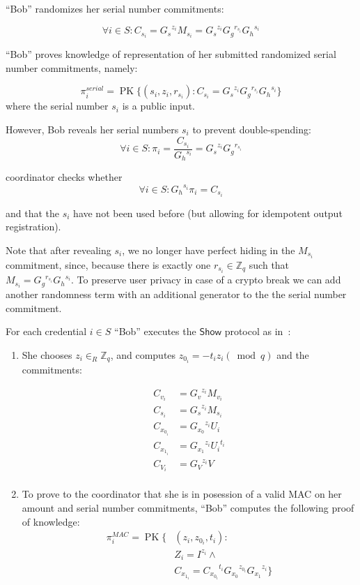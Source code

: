 \documentclass{article}
\begin{document}
``Bob'' randomizes her serial number commitments:

\[ \forall i \in S: C_{{s_i}}={G_s}^{z_i}M_{s_i}={G_s}^{z_i}{G_g}^{r_{s_i}}{G_h}^{s_i} \]

``Bob'' proves knowledge of representation of her submitted randomized serial number commitments, namely:

\[
\pi_{i}^{\mathit{serial}}=\operatorname{PK}\{ (s_i, z_i, r_{s_i}):C_{s_i} = {G_s}^{z_i}{G_g}^{r_{s_i}}{G_h}^{s_i}
\}
\]
where the serial number $s_i$ is a public input.

However, Bob reveals her serial numbers $s_i$ to prevent double-spending:
\[ \forall i \in S: \pi_i=\frac{C_{{s_i}}}{{G_h}^{s_i}} = {G_s}^{z_i} {G_g}^{r_{s_i}} \]

coordinator checks whether \[ \forall i \in S: {G_h}^{s_i} \pi_i = C_{s_i} \]

and that the $s_i$ have not been used before (but allowing for idempotent output registration).

Note that after revealing $s_i$, we no longer have perfect hiding in the $M_{s_i}$ commitment, since, because there is exactly one $r_{s_i} \in \mathbb{Z}_q$ such that $M_{s_i} = {G_g}^{r_{s_i}} {G_h}^{s_i}$. To preserve user privacy in case of a crypto break we can add another randomness term with an additional generator to the the serial number commitment.

For each credential $i \in S$ ``Bob'' executes the $\mathsf{Show}$ protocol as in~\cite{chase2019signal}:

\begin{enumerate}

\item She chooses
$z_i \in_{R} \mathbb{Z}_{q}$,
and computes 
$z_{0_i}=-{t_i} {z_i} (\bmod q)$
and the commitments:

\begin{align*}
C_{v_i}     &= {G_v}^{z_i} M_{v_i} \\
C_{s_i}     &= {G_s}^{z_i} M_{s_i} \\
C_{x_{0_i}} &= {G_{x_0}}^{z_i} {U_i} \\
C_{x_{1_i}} &= {G_{x_1}}^{z_i} {U_i}^{t_i} \\
C_{V_i}     &= {G_V}^{z_i} V \\
\end{align*}


\item To prove to the coordinator that she is in posession of a valid MAC on her amount and serial number commitments, ``Bob'' computes the following proof of knowledge:
\begin{align*}
\pi_{i}^{\mathit{MAC}}=\operatorname{PK}\{
& (z_i, z_{0_i},t_i): \\
& Z_i =I^{z_i} \land \\ %
& C_{x_{1_i}} = {C_{x_{0_i}}}^{t_i} {G_{x_0}}^{z_{0_i}} {G_{x_1}}^{z_i}\}
\end{align*}
\end{enumerate}
\end{document}

